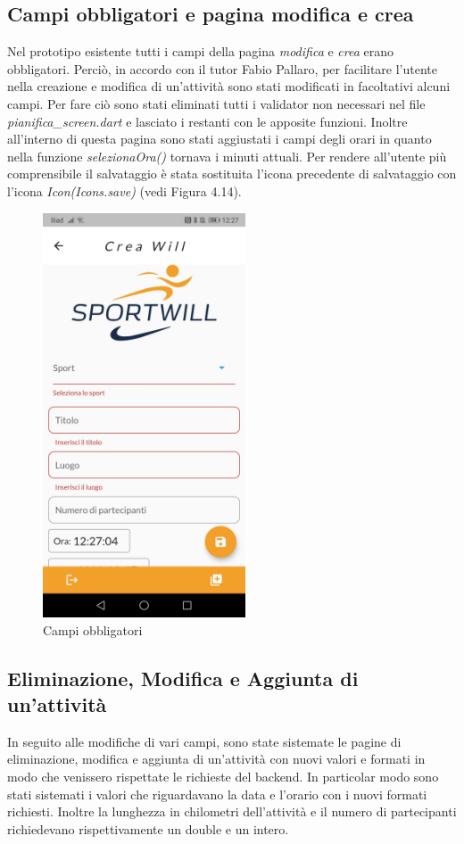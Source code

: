 \newpage

\subsection{Campi obbligatori e pagina modifica e crea}
Nel prototipo esistente tutti i campi della pagina \textit{modifica} e \textit{crea} erano obbligatori. Perciò, in accordo con il tutor Fabio Pallaro, per facilitare l'utente nella creazione e modifica di un'attività sono stati modificati in facoltativi alcuni campi.
Per fare ciò sono stati eliminati tutti i validator non necessari nel file \textit{pianifica\_screen.dart} e lasciato i restanti con le apposite funzioni.
Inoltre all'interno di questa pagina sono stati aggiustati i campi degli orari in quanto nella funzione \textit{selezionaOra()} tornava i minuti attuali.
Per rendere all'utente più comprensibile il salvataggio è stata sostituita l'icona precedente di salvataggio con l'icona \textit{Icon(Icons.save)} (vedi Figura 4.14).\\

\begin{figure}[htbp]	
	\centering
	\includegraphics[width=6cm]{immagini/modifica.jpeg}
	\caption{Campi obbligatori}
	\label{fig:Campi obbligatori}
\end{figure}

\newpage

\subsection{Eliminazione, Modifica e Aggiunta di un'attività}
In seguito alle modifiche di vari campi, sono state sistemate le pagine di eliminazione, modifica e aggiunta di un'attività con nuovi valori e formati in modo che venissero rispettate le richieste del backend.
In particolar modo sono stati sistemati i valori che riguardavano la data e l'orario con i nuovi formati richiesti. Inoltre la lunghezza in  chilometri dell'attività e il numero di partecipanti richiedevano rispettivamente un double e un intero.

